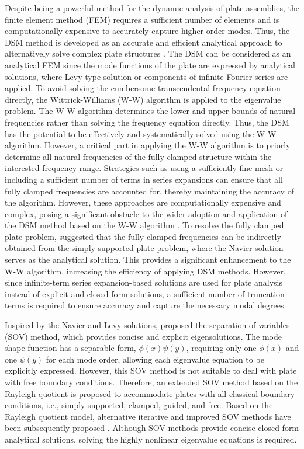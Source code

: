 \documentclass[preprint,12pt]{elsarticle}
\begin{document}
Despite being a powerful method for the dynamic analysis of plate assemblies, the finite element method (FEM) requires a sufficient number of elements and is computationally expensive to accurately capture higher-order modes.
Thus, the DSM method is developed as an accurate and efficient analytical approach to alternatively solve complex plate structures \cite{boscolo2011dynamic,fazzolari2013exact}. 
The DSM can be considered as an analytical FEM since the mode functions of the plate are expressed by analytical solutions, where Levy-type solution \cite{ghorbel2015dynamic} or components of infinite Fourier series \cite{banerjee2015dynamic,liu2016free} are applied.
To avoid solving the cumbersome transcendental frequency equation directly, the Wittrick-Williams (W-W) algorithm \cite{wittrick1971general} is applied to the eigenvalue problem.
The W-W algorithm determines the lower and upper bounds of natural frequencies rather than solving the frequency equation directly. 
Thus, the DSM has the potential to be effectively and systematically solved using the W-W algorithm.
However, a critical part in applying the W-W algorithm is to priorly determine all natural frequencies of the fully clamped structure within the interested frequency range.
Strategies such as using a sufficiently fine mesh or including a sufficient number of terms in series expansions \cite{banerjee2015dynamic} can ensure that all fully clamped frequencies are accounted for, thereby maintaining the accuracy of the algorithm. However, these approaches are computationally expensive and complex, posing a significant obstacle to the wider adoption and application of the DSM method based on the W-W algorithm \cite{han2018improved}.
To resolve the fully clamped plate problem, \citet{liu2015exact} suggested that the fully clamped frequencies can be indirectly obtained from the simply supported plate problem, where the Navier solution serves as the analytical solution. This provides a significant enhancement to the W-W algorithm, increasing the efficiency of applying DSM methods. 
However, since infinite-term series expansion-based solutions are used for plate analysis instead of explicit and closed-form solutions, a sufficient number of truncation terms is required to ensure accuracy and capture the necessary modal degrees.  

Inspired by the Navier and Levy solutions, \citet{xing2009new} proposed the separation-of-variables (SOV) method, which provides concise and explicit eigensolutions.
The mode shape function has a separable form, $\phi(x) \psi(y)$, requiring only one $\phi(x)$ and one $\psi(y)$ for each mode order, allowing each eigenvalue equation to be explicitly expressed.
However, this SOV method is not suitable to deal with plate with free boundary conditions.
Therefore, an extended SOV method \cite{xing2018overall, xing2020extended} based on the Rayleigh quotient is proposed to accommodate plates with all classical boundary conditions, i.e., simply supported, clamped, guided, and free.
Based on the Rayleigh quotient model, alternative iterative and improved SOV methods have been subsequently proposed \cite{xing2020improved}.
Although SOV methods provide concise closed-form analytical solutions, solving the highly nonlinear eigenvalue equations is required.
\end{document}
